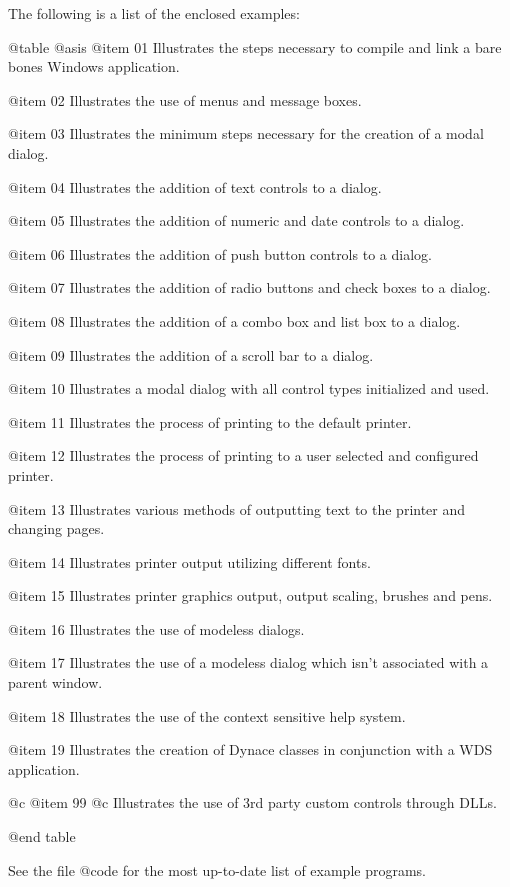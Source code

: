 The following is a list of the enclosed examples:

@table @asis
@item 01
Illustrates the steps necessary to compile and link a bare bones
Windows application.

@item 02
Illustrates the use of menus and message boxes.

@item 03
Illustrates the minimum steps necessary for the creation of a modal dialog.

@item 04
Illustrates the addition of text controls to a dialog.

@item 05
Illustrates the addition of numeric and date controls to a dialog.

@item 06
Illustrates the addition of push button controls to a dialog.

@item 07
Illustrates the addition of radio buttons and check boxes to a dialog.

@item 08
Illustrates the addition of a combo box and list box to a dialog.

@item 09
Illustrates the addition of a scroll bar to a dialog.

@item 10
Illustrates a modal dialog with all control types initialized and used.

@item 11
Illustrates the process of printing to the default printer.

@item 12
Illustrates the process of printing to a user selected and configured printer.

@item 13
Illustrates various methods of outputting text to the printer and
changing pages.

@item 14
Illustrates printer output utilizing different fonts.

@item 15
Illustrates printer graphics output, output scaling, brushes and pens.

@item 16
Illustrates the use of modeless dialogs.

@item 17
Illustrates the use of a modeless dialog which isn't associated with a parent
window.

@item 18
Illustrates the use of the context sensitive help system.

@item 19
Illustrates the creation of Dynace classes in conjunction with a WDS
application.

@c @item 99
@c Illustrates the use of 3rd party custom controls through DLLs.

@end table

See the file @code{\DYNACE\WINEXAM\LIST} for the most up-to-date list
of example programs.


